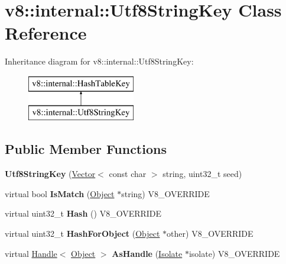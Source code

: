 \hypertarget{classv8_1_1internal_1_1_utf8_string_key}{}\section{v8\+:\+:internal\+:\+:Utf8\+String\+Key Class Reference}
\label{classv8_1_1internal_1_1_utf8_string_key}
Inheritance diagram for v8\+:\+:internal\+:\+:Utf8\+String\+Key\+:\begin{figure}[H]
\begin{center}
\leavevmode
\includegraphics[height=2.000000cm]{classv8_1_1internal_1_1_utf8_string_key}
\end{center}
\end{figure}
\subsection*{Public Member Functions}
\begin{DoxyCompactItemize}
\item 
\hypertarget{classv8_1_1internal_1_1_utf8_string_key_a68ab9f0d0de34dc7634c3f7c41ec9e48}{}{\bfseries Utf8\+String\+Key} (\hyperlink{classv8_1_1internal_1_1_vector}{Vector}$<$ const char $>$ string, uint32\+\_\+t seed)\label{classv8_1_1internal_1_1_utf8_string_key_a68ab9f0d0de34dc7634c3f7c41ec9e48}

\item 
\hypertarget{classv8_1_1internal_1_1_utf8_string_key_a8335f0a56ec942dc55354cc9ad82a194}{}virtual bool {\bfseries Is\+Match} (\hyperlink{classv8_1_1internal_1_1_object}{Object} $\ast$string) V8\+\_\+\+O\+V\+E\+R\+R\+I\+D\+E\label{classv8_1_1internal_1_1_utf8_string_key_a8335f0a56ec942dc55354cc9ad82a194}

\item 
\hypertarget{classv8_1_1internal_1_1_utf8_string_key_a4164afef5a88aa969d5d3c1b1079ef05}{}virtual uint32\+\_\+t {\bfseries Hash} () V8\+\_\+\+O\+V\+E\+R\+R\+I\+D\+E\label{classv8_1_1internal_1_1_utf8_string_key_a4164afef5a88aa969d5d3c1b1079ef05}

\item 
\hypertarget{classv8_1_1internal_1_1_utf8_string_key_a1805151237c7fb6a86fbdb488bdc9066}{}virtual uint32\+\_\+t {\bfseries Hash\+For\+Object} (\hyperlink{classv8_1_1internal_1_1_object}{Object} $\ast$other) V8\+\_\+\+O\+V\+E\+R\+R\+I\+D\+E\label{classv8_1_1internal_1_1_utf8_string_key_a1805151237c7fb6a86fbdb488bdc9066}

\item 
\hypertarget{classv8_1_1internal_1_1_utf8_string_key_a1a9a586db2c0f33a7b884b9f2795b4fc}{}virtual \hyperlink{classv8_1_1internal_1_1_handle}{Handle}$<$ \hyperlink{classv8_1_1internal_1_1_object}{Object} $>$ {\bfseries As\+Handle} (\hyperlink{classv8_1_1internal_1_1_isolate}{Isolate} $\ast$isolate) V8\+\_\+\+O\+V\+E\+R\+R\+I\+D\+E\label{classv8_1_1internal_1_1_utf8_string_key_a1a9a586db2c0f33a7b884b9f2795b4fc}

\end{DoxyCompactItemize}
